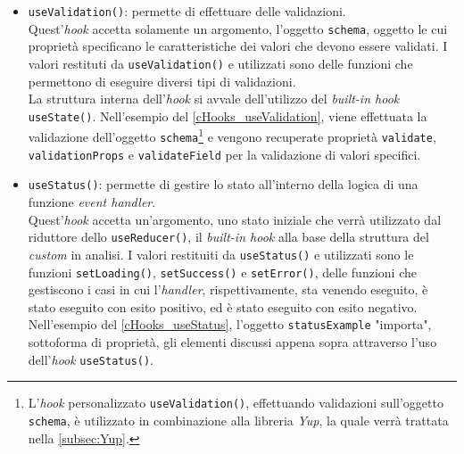 \begin{itemize}
  

  \item {\texttt{useValidation()}}: permette di effettuare delle validazioni.\\
  Quest'\textit{hook} accetta solamente un argomento, l'oggetto \texttt{schema}, oggetto le cui proprietà specificano le caratteristiche dei valori che devono essere validati. I valori restituti da \texttt{useValidation()} e utilizzati sono delle funzioni che permettono di eseguire diversi tipi di validazioni.\\
  La struttura interna dell'\textit{hook} si avvale dell'utilizzo del \textit{built-in hook} \texttt{useState()}.
  Nell'esempio del \autoref{cHooks_useValidation}, viene effettuata la validazione dell'oggetto \texttt{schema}\footnote{L'\textit{hook} personalizzato \texttt{useValidation()}, effettuando validazioni sull'oggetto \texttt{schema}, è utilizzato in combinazione alla libreria \textit{Yup}, la quale verrà trattata nella \autoref{subsec:Yup}.} e vengono recuperate proprietà \texttt{validate}, \texttt{validationProps} e \texttt{validateField} per la validazione di valori specifici.
  
  
  
  \item {\texttt{useStatus()}}: permette di gestire lo stato all'interno della logica di una funzione \textit{event handler}.\\
  Quest'\textit{hook} accetta un'argomento, uno stato iniziale che verrà utilizzato dal riduttore dello \texttt{useReducer()}, il \textit{built-in hook} alla base della struttura del \textit{custom} in analisi. I valori restituiti da \texttt{useStatus()} e utilizzati sono le funzioni \texttt{setLoading()}, \texttt{setSuccess()} e \texttt{setError()}, delle funzioni che gestiscono i casi in cui l'\textit{handler}, rispettivamente, sta venendo eseguito, è stato eseguito con esito positivo, ed è stato eseguito con esito negativo.\\
  Nell'esempio del \autoref{cHooks_useStatus}, l'oggetto \texttt{statusExample} "importa", sottoforma di proprietà, gli elementi discussi appena sopra attraverso l'uso dell'\textit{hook} \texttt{useStatus()}.  
  
  
\end{itemize}


